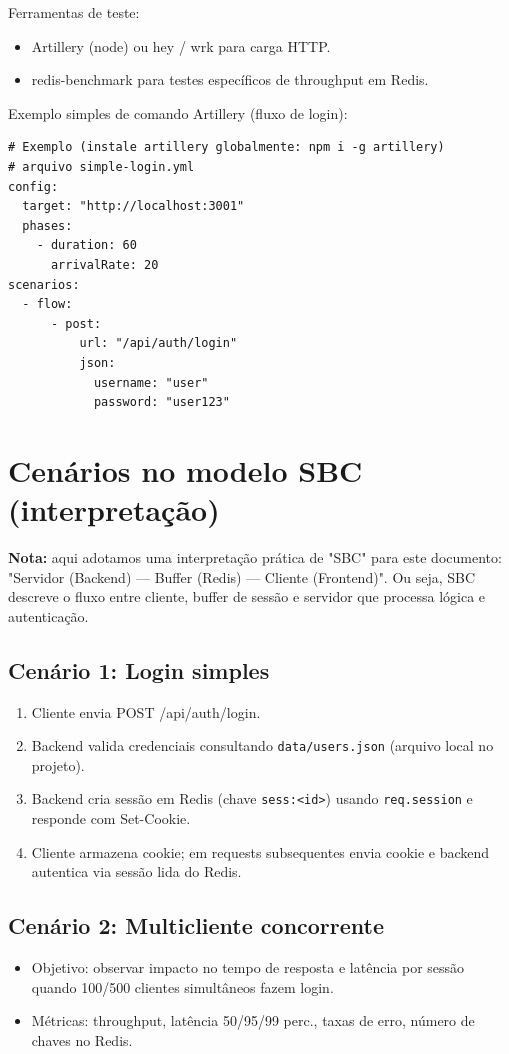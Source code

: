 \documentclass[a4paper,11pt]{article}
\begin{document}
Ferramentas de teste:
\begin{itemize}
  \item Artillery (node) ou hey / wrk para carga HTTP.
  \item redis-benchmark para testes específicos de throughput em Redis.
\end{itemize}

Exemplo simples de comando Artillery (fluxo de login):
\begin{lstlisting}
# Exemplo (instale artillery globalmente: npm i -g artillery)
# arquivo simple-login.yml
config:
  target: "http://localhost:3001"
  phases:
    - duration: 60
      arrivalRate: 20
scenarios:
  - flow:
      - post:
          url: "/api/auth/login"
          json:
            username: "user"
            password: "user123"
\end{lstlisting}

\section{Cenários no modelo SBC (interpretação)}
\textbf{Nota:} aqui adotamos uma interpretação prática de "SBC" para este documento: "Servidor (Backend) — Buffer (Redis) — Cliente (Frontend)". Ou seja, SBC descreve o fluxo entre cliente, buffer de sessão e servidor que processa lógica e autenticação.

\subsection*{Cenário 1: Login simples}
\begin{enumerate}
  \item Cliente envia POST /api/auth/login.
  \item Backend valida credenciais consultando \texttt{data/users.json} (arquivo local no projeto).
  \item Backend cria sessão em Redis (chave \texttt{sess:<id>}) usando \texttt{req.session} e responde com Set-Cookie.
  \item Cliente armazena cookie; em requests subsequentes envia cookie e backend autentica via sessão lida do Redis.
\end{enumerate}

\subsection*{Cenário 2: Multicliente concorrente}
\begin{itemize}
  \item Objetivo: observar impacto no tempo de resposta e latência por sessão quando 100/500 clientes simultâneos fazem login.
  \item Métricas: throughput, latência 50/95/99 perc., taxas de erro, número de chaves no Redis.
\end{itemize}
\end{document}
